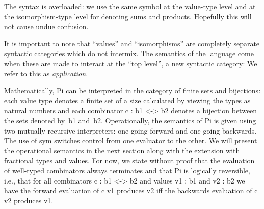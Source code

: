\documentclass{llncs}
\begin{document}
%
%
%
\noindent The syntax is overloaded: we use the same symbol at the value-type level
and at the isomorphism-type level for denoting sums and products.  Hopefully
this will not cause undue confusion.

It is important to note that ``values'' and ``isomorphisms'' are completely
separate syntactic categories which do not intermix. The semantics of the
language come when these are made to interact at the ``top level'', a new
syntactic category:
\noindent We refer to this as \emph{application}.



Mathematically, {{Pi}} can be interpreted in the category of finite sets and
bijections: each value type denotes a finite set of a size calculated by
viewing the types as natural numbers and each combinator {{c : b1 <-> b2}}
denotes a bijection between the sets denoted by~{{b1}}
and~{{b2}}. Operationally, the semantics of {{Pi}} is given using two
mutually recursive interpreters: one going forward and one going
backwards. The use of {{sym}} switches control from one evaluator to the
other. We will present the operational semantics in the next section along
with the extension with fractional types and values. For now, we state
without proof that the evaluation of well-typed combinators always terminates
and that {{Pi}} is logically reversible, i.e., that for all combinators 
{{c : b1 <-> b2}} and values {{v1 : b1}} and {{v2 : b2}} we have the forward
evaluation of {{c v1}} produces {{v2}} iff the backwards evaluation of 
{{c v2}} produces {{v1}}.
\end{document}
